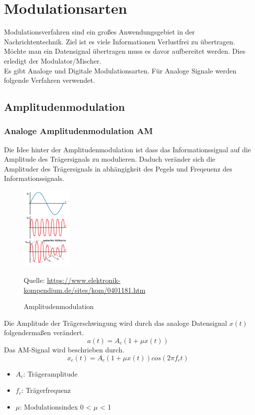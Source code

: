 \section{Modulationsarten}
Modulationsverfahren sind ein großes Anwendungsgebiet in der Nachrichtentechnik.
Ziel ist es viele Informationen Verlustfrei zu übertragen.
Möchte man ein Datensignal übertragen muss es davor
aufbereitet werden. Dies erledigt der Modulator/Mischer.
\\
Es gibt Analoge und Digitale Modulationsarten.
Für Analoge Signale werden folgende Verfahren verwendet.


\subsection{Amplitudenmodulation}
\subsubsection{Analoge Amplitudenmodulation AM}
Die Idee hinter der Amplitudenmodulation ist dass das Informationssignal
auf die Amplitude des Trägersignals zu modulieren.
Daduch veränder sich die Amplituder des Trägersignals in abhängigkeit des Pegels und 
Freqeuenz des Informationssignals.
\\
\begin{figure}[h]
    \centering
    \includegraphics[width=0.22\textwidth]{Pictures/Screenshot 2025-06-19 125508.png}
    \caption{Amplitudenmodulation}
    \footnotesize{Quelle: \url{https://www.elektronik-kompendium.de/sites/kom/0401181.htm}}
    \label{fig:link_budget}
\end{figure}
\clearpage
Die Amplitude der Trägerschwingung wird durch das analoge Datensignal
$x(t)$ folgendermaßen verändert.
\begin{equation}
    a(t)=A_c(1+\mu x(t))
\end{equation}
Das AM-Signal wird beschrieben durch.
\begin{equation}
    x_c(t)=A_c(1+\mu x(t))cos(2\pi f_c t)
\end{equation}
\begin{itemize}
    \item $A_c$: Trägeramplitude
    \item $f_c$: Trägerfrequenz
    \item $\mu$: Modulationsindex 0 < $\mu$ < 1
\end{itemize}

